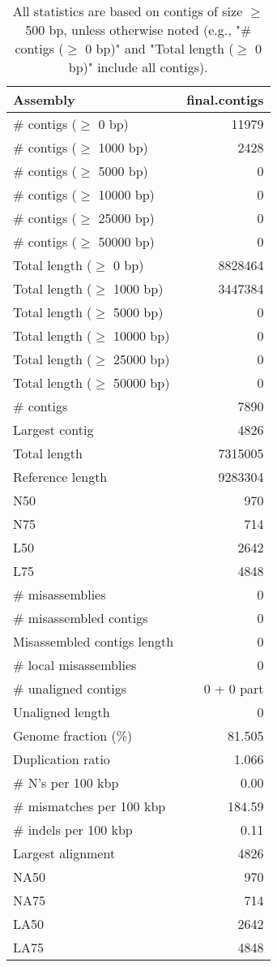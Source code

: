 \documentclass[12pt,a4paper]{article}
\begin{document}
\begin{table}[ht]
\begin{center}
\caption{All statistics are based on contigs of size $\geq$ 500 bp, unless otherwise noted (e.g., "\# contigs ($\geq$ 0 bp)" and "Total length ($\geq$ 0 bp)" include all contigs).}
\begin{tabular}{|l*{1}{|r}|}
\hline
Assembly & final.contigs \\ \hline
\# contigs ($\geq$ 0 bp) & 11979 \\ \hline
\# contigs ($\geq$ 1000 bp) & 2428 \\ \hline
\# contigs ($\geq$ 5000 bp) & 0 \\ \hline
\# contigs ($\geq$ 10000 bp) & 0 \\ \hline
\# contigs ($\geq$ 25000 bp) & 0 \\ \hline
\# contigs ($\geq$ 50000 bp) & 0 \\ \hline
Total length ($\geq$ 0 bp) & 8828464 \\ \hline
Total length ($\geq$ 1000 bp) & 3447384 \\ \hline
Total length ($\geq$ 5000 bp) & 0 \\ \hline
Total length ($\geq$ 10000 bp) & 0 \\ \hline
Total length ($\geq$ 25000 bp) & 0 \\ \hline
Total length ($\geq$ 50000 bp) & 0 \\ \hline
\# contigs & 7890 \\ \hline
Largest contig & 4826 \\ \hline
Total length & 7315005 \\ \hline
Reference length & 9283304 \\ \hline
N50 & 970 \\ \hline
N75 & 714 \\ \hline
L50 & 2642 \\ \hline
L75 & 4848 \\ \hline
\# misassemblies & 0 \\ \hline
\# misassembled contigs & 0 \\ \hline
Misassembled contigs length & 0 \\ \hline
\# local misassemblies & 0 \\ \hline
\# unaligned contigs & 0 + 0 part \\ \hline
Unaligned length & 0 \\ \hline
Genome fraction (\%) & 81.505 \\ \hline
Duplication ratio & 1.066 \\ \hline
\# N's per 100 kbp & 0.00 \\ \hline
\# mismatches per 100 kbp & 184.59 \\ \hline
\# indels per 100 kbp & 0.11 \\ \hline
Largest alignment & 4826 \\ \hline
NA50 & 970 \\ \hline
NA75 & 714 \\ \hline
LA50 & 2642 \\ \hline
LA75 & 4848 \\ \hline
\end{tabular}
\end{center}
\end{table}
\end{document}
